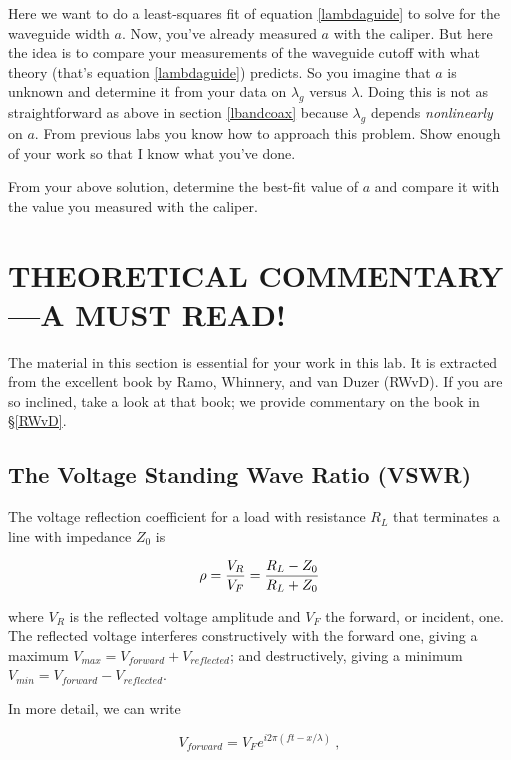 \documentclass[preprint]{aastex}
\begin{document}
Here we want to do a least-squares fit of equation \ref{lambdaguide} to
solve for the waveguide width $a$. Now, you've already measured $a$ with
the caliper. But here the idea is to compare your measurements of the
waveguide cutoff with what theory (that's equation \ref{lambdaguide})
predicts. So you imagine that $a$ is unknown and determine it from your
data on $\lambda_g$ versus $\lambda$.  Doing this is not as straightforward
as above in section \ref{lbandcoax} because $\lambda_g$ depends {\it
  nonlinearly} on $a$. From previous labs you know how to approach this
problem. Show enough of your work so that I know what you've done.

	From your above solution, determine the best-fit value of $a$
and compare it with the value you measured with the caliper.

\section{THEORETICAL COMMENTARY---A MUST READ!}

	The material in this section is essential for your work in this
lab.  It is extracted from the excellent book by Ramo, Whinnery, and van
Duzer (RWvD).  If you are so inclined, take a look at that book; we
provide commentary on the book in \S \ref{RWvD}. 

\subsection{The Voltage Standing Wave Ratio (VSWR)} \label{VSWR}

	The voltage reflection coefficient for a load with resistance
$R_L$ that terminates a line with impedance $Z_0$ is

\begin{equation}
\rho = {V_R \over V_F} = {R_L - Z_0 \over R_L + Z_0}
\end{equation}

\noindent where $V_R$ is the reflected voltage amplitude and $V_F$ the
forward, or incident, one. The reflected voltage interferes
constructively with the forward one, giving a maximum $V_{max}=
V_{forward} + V_{reflected}$; and destructively, giving a minimum
$V_{min}= V_{forward} - V_{reflected}$.  

	In more detail, we can write

\begin{equation} 
V_{forward} = V_F e^{i2 \pi (f t - x/\lambda)} \ ,
\end{equation}
\end{document}
